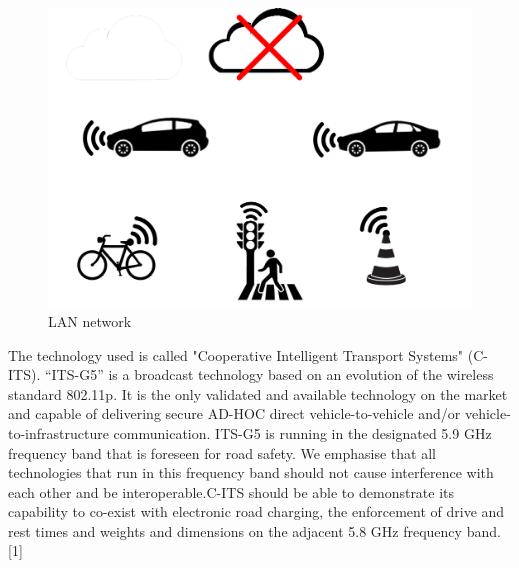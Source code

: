\begin{figure}[H]
    \centering
    \includegraphics[scale=0.4]{images/projektsketch.jpg}
    \caption{LAN network}
\end{figure}

The technology used is called "Cooperative Intelligent Transport Systems" (C-ITS).  “ITS-G5” is a broadcast technology based on an evolution of the wireless standard 802.11p. It is the only validated and available technology on the market and capable of delivering secure AD-HOC direct vehicle-to-vehicle and/or vehicle-to-infrastructure communication. ITS-G5 is running in the designated 5.9 GHz frequency band that is foreseen for road safety. We emphasise that all technologies that run in this frequency band should not cause interference with each other and be interoperable.C-ITS should be able to demonstrate its capability to co-exist with electronic road charging, the enforcement of drive and rest times and weights and dimensions on the adjacent 5.8 GHz frequency band. [1]
